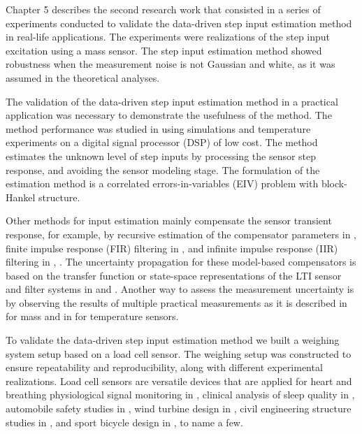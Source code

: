 \color{blue}Chapter 5 describes \color{black} the second research work that consisted in a series of experiments conducted to validate the data-driven step input estimation method in real-life applications.
The experiments were realizations of the step input excitation using a mass sensor.
The step input estimation method showed robustness when the measurement noise is not Gaussian and white, as it was assumed in the theoretical analyses.

The validation of the data-driven step input estimation method in a practical application was necessary to demonstrate the usefulness of the method.
The method performance was studied in \citet{Markovsky15cep} using simulations and temperature experiments on a digital signal processor (DSP) of low cost.
The method estimates the unknown level of step inputs by processing the sensor step response, and 
avoiding the sensor modeling stage.
The formulation of the estimation method is a correlated errors-in-variables (EIV) problem with block-Hankel structure.

Other methods for input estimation mainly compensate the sensor transient response, for example, by 
recursive estimation of the compensator parameters in \citet{Shu93}, 
finite impulse response (FIR) filtering in \citet{Elster07}, \citet{Niedzwiecki16b} and 
infinite impulse response (IIR) filtering in \citet{Pintelon90}, \citet{Elster08}.
The uncertainty propagation for these model-based compensators is based on the transfer function or state-space representations of the LTI sensor and filter systems in \citet{Link09} and \citet{Hale09}.
Another way to assess the measurement uncertainty is by observing the results of multiple practical measurements as it is described in \citet{Pietrzak14} for mass and in \citet{Ogorevc16} for temperature sensors.

To validate the data-driven step input estimation method we built a weighing system setup based on a load cell sensor.
The weighing setup was constructed to ensure repeatability and reproducibility, along with different experimental realizations.
Load cell sensors are versatile devices that are applied for
heart and breathing physiological signal monitoring in \citet{Lee16},
clinical analysis of sleep quality in \citet{Zahradka18},
automobile safety studies in \citet{Ballo16},
wind turbine design in \citet{Rossander15}, 
civil engineering structure studies in \citet{Olmi16}, and 
sport bicycle design in \citet{Casas16}, to name a few.


